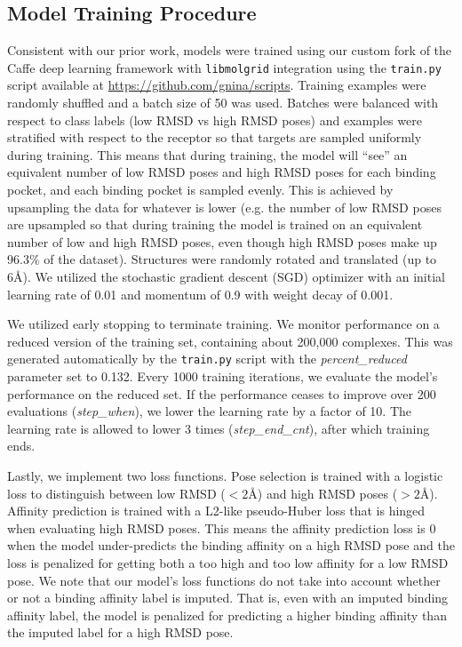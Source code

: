 \documentclass[journal=jcim,manuscript=article]{achemso}
\begin{document}
\subsection{Model Training Procedure}
Consistent with our prior work\cite{crossdocked2020}, models were trained using our custom fork of the Caffe deep learning framework \cite{jia2014caffe} with \texttt{libmolgrid} integration \cite{sunseri2019libmolgrid} using the \texttt{train.py} script available at \url{https://github.com/gnina/scripts}.
Training examples were randomly shuffled and a batch size of 50 was used.
Batches were balanced with respect to class labels (low RMSD vs high RMSD poses) and examples were stratified with respect to the receptor so that targets are sampled uniformly during training.
This means that during training, the model will ``see'' an equivalent number of low RMSD poses and high RMSD poses for each binding pocket, and each binding pocket is sampled evenly.
This is achieved by upsampling the data for whatever is lower (e.g. the number of low RMSD poses are upsampled so that during training the model is trained on an equivalent number of low and high RMSD poses, even though high RMSD poses make up 96.3\% of the dataset).
Structures were randomly rotated and translated (up to 6{\AA}).
We utilized the stochastic gradient descent (SGD) optimizer with an initial learning rate of 0.01 and momentum of 0.9 with weight decay of 0.001.

We utilized early stopping to terminate training.
We monitor performance on a reduced version of the training set, containing about 200,000 complexes.
This was generated automatically by the \texttt{train.py} script with the \textit{percent\_reduced} parameter set to 0.132.
Every 1000 training iterations, we evaluate the model's performance on the reduced set.
If the performance ceases to improve over 200 evaluations (\textit{step\_when}), we lower the learning rate by a factor of 10.
The learning rate is allowed to lower 3 times (\textit{step\_end\_cnt}), after which training ends.

Lastly, we implement two loss functions.
Pose selection is trained with a logistic loss to distinguish between low RMSD ($<2${\AA}) and high RMSD poses ($>2${\AA}).
Affinity prediction is trained with a L2-like pseudo-Huber loss that is hinged when evaluating high RMSD poses.
This means the affinity prediction loss is 0 when the model under-predicts the binding affinity on a high RMSD pose and the loss is penalized for getting both a too high and too low affinity for a low RMSD pose.
We note that our model's loss functions do not take into account whether or not a binding affinity label is imputed.
That is, even with an imputed binding affinity label, the model is penalized for predicting a higher binding affinity than the imputed label for a high RMSD pose.
\end{document}
